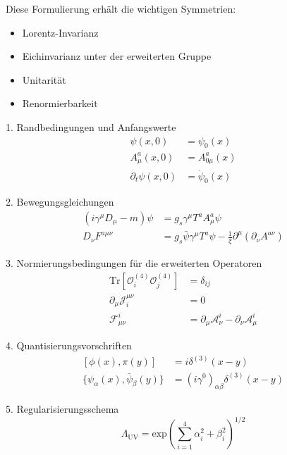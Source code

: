 \documentclass{article}
\begin{document}
Diese Formulierung erhält die wichtigen Symmetrien:

\begin{itemize}
	\item Lorentz-Invarianz
	\item Eichinvarianz unter der erweiterten Gruppe
	\item Unitarität
	\item Renormierbarkeit
\end{itemize}
 1. Randbedingungen und Anfangswerte
\begin{equation}
	\begin{aligned}
		\psi(x,0) &= \psi_0(x) \\
		A_\mu^a(x,0) &= A_{0\mu}^a(x) \\
		\partial_t\psi(x,0) &= \dot{\psi}_0(x)
	\end{aligned}
\end{equation}

 2. Bewegungsgleichungen
\begin{equation}
	\begin{aligned}
		(i\gamma^\mu D_\mu - m)\psi &= g_s\gamma^\mu T^a A_\mu^a\psi \\
		D_\nu F^{a\mu\nu} &= g_s\bar{\psi}\gamma^\mu T^a\psi - \frac{1}{\xi}\partial^\mu(\partial_\nu A^{a\nu})
	\end{aligned}
\end{equation}

 3. Normierungsbedingungen für die erweiterten Operatoren
\begin{equation}
	\begin{aligned}
		\text{Tr}[\mathcal{O}_i^{(4)}\mathcal{O}_j^{(4)}] &= \delta_{ij} \\
		\partial_\mu \mathcal{J}_i^{\mu\nu} &= 0 \\
		\mathcal{F}_{\mu\nu}^i &= \partial_\mu \mathcal{A}_\nu^i - \partial_\nu \mathcal{A}_\mu^i
	\end{aligned}
\end{equation}

 4. Quantisierungsvorschriften
\begin{equation}
	\begin{aligned}
		[\phi(x),\pi(y)] &= i\delta^{(3)}(x-y) \\
		\{\psi_\alpha(x),\bar{\psi}_\beta(y)\} &= (i\gamma^0)_{\alpha\beta}\delta^{(3)}(x-y)
	\end{aligned}
\end{equation}

 5. Regularisierungsschema
\begin{equation}
	\Lambda_\text{UV} = \text{exp}\left(\sum_{i=1}^4 \alpha_i^2 + \beta_i^2\right)^{1/2}
\end{equation}
\end{document}
